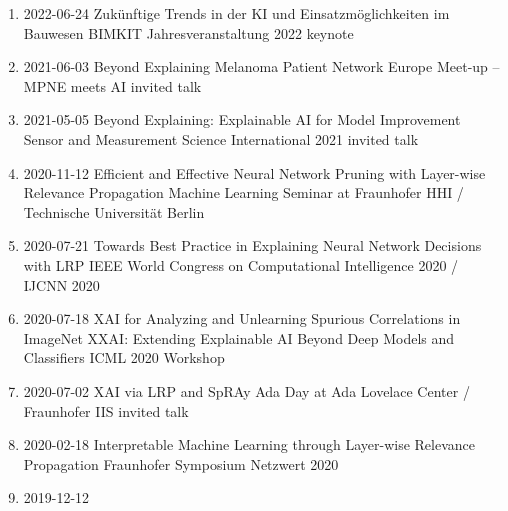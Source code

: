 \documentclass[10pt,a4paper]{article} %
\begin{document}
{
\begin{enumerate}
    \item {}
                    {2022-06-24}
                    {Zukünftige Trends in der KI und Einsatzmöglichkeiten im Bauwesen}
                    {BIMKIT Jahresveranstaltung 2022}
                    {keynote}
    \item {}
                    {2021-06-03}
                    {Beyond Explaining}
                    {Melanoma Patient Network Europe Meet-up -- MPNE meets AI }
                    {invited talk}
    \item {}
                    {2021-05-05}
                    {Beyond Explaining: Explainable AI for Model Improvement}
                    {Sensor and Measurement Science International 2021}
                    {invited talk}
    \item {}
                    {2020-11-12}
                    {Efficient and Effective Neural Network Pruning with Layer-wise Relevance Propagation}
                    {Machine Learning Seminar at Fraunhofer HHI / Technische Universität Berlin}
    \item {}
                    {2020-07-21}
                    {Towards Best Practice in Explaining Neural Network Decisions with LRP}
                    {IEEE World Congress on Computational Intelligence 2020 / IJCNN 2020}
    \item {}
                    {2020-07-18}
                    {XAI for Analyzing and Unlearning Spurious Correlations in ImageNet}
                    {XXAI: Extending Explainable AI Beyond Deep Models and Classifiers}
                    {ICML 2020 Workshop}
    \item {}
                    {2020-07-02}
                    {XAI via LRP and SpRAy}
                    {Ada Day at Ada Lovelace Center / Fraunhofer IIS}
                    {invited talk}
    \item {}
                    {2020-02-18}
                    {Interpretable Machine Learning through Layer-wise Relevance Propagation}
                    {Fraunhofer Symposium Netzwert 2020}
    \item {}
                    {2019-12-12}

\end{enumerate}}
\end{document}
